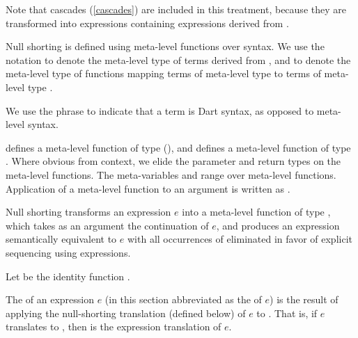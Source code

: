 \documentclass[makeidx]{article}
\begin{document}
{{Note that cascades
(\ref{cascades})
are included in this treatment,
because they are transformed into \LET{} expressions
containing expressions derived from .%
}

\LMHash{}%
Null shorting is defined using meta-level functions over syntax.
We use the notation
to denote the meta-level type of terms derived from , and
to denote the meta-level type of functions mapping
terms of meta-level type  to
terms of meta-level type .

\LMHash{}%
We use the phrase
to indicate that a term is Dart syntax,
as opposed to meta-level syntax.

\LMHash{}%
defines a meta-level function of type
(),
and
defines a meta-level function of type
.
Where obvious from context,
we elide the parameter and return types on the meta-level functions.
The meta-variables  and 
range over meta-level functions.
Application of a meta-level function  to an argument 
is written as .

\LMHash{}%
Null shorting transforms an expression $e$
into a meta-level function  of type
,
which takes as an argument the continuation of $e$,
and produces an expression semantically equivalent to $e$
with all occurrences of  eliminated
in favor of explicit sequencing using \LET{} expressions.

\LMHash{}%
Let
be the identity function
.

\LMHash{}%
The
of an expression $e$
(in this section abbreviated as the  of $e$)
is the result of applying the null-shorting translation (defined below)
of $e$ to .
That is, if $e$ translates to ,
then  is the expression translation of $e$.

}
\end{document}
